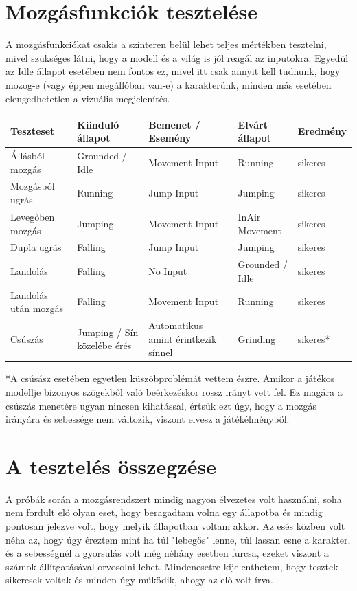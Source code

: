 \section{Mozgásfunkciók tesztelése}

A mozgásfunkciókat csakis a színteren belül lehet teljes mértékben tesztelni, mivel szükséges látni, hogy a modell és a világ is jól reagál az inputokra. Egyedül az Idle állapot esetében nem fontos ez, mivel itt csak annyit kell tudnunk, hogy mozog-e (vagy éppen megállóban van-e) a karakterünk, minden más esetében elengedhetetlen a vizuális megjelenítés.

\begin{tabularx}{\textwidth}{ 
  | >{\raggedright\arraybackslash}X 
  | >{\raggedright\arraybackslash}X 
  | >{\raggedright\arraybackslash}X 
  | >{\raggedright\arraybackslash}X
  | >{\raggedright\arraybackslash}X |}
\hline
Teszteset & Kiinduló állapot & Bemenet / Esemény & Elvárt állapot & Eredmény\\
\hline
Állásból mozgás & Grounded / Idle & Movement Input & Running & sikeres\\
Mozgásból ugrás & Running & Jump Input & Jumping & sikeres\\
Levegőben mozgás & Jumping & Movement Input & InAir Movement & sikeres\\
Dupla ugrás & Falling & Jump Input & Jumping & sikeres\\
Landolás & Falling & No Input & Grounded / Idle & sikeres\\
Landolás után mozgás & Falling & Movement Input & Running & sikeres\\
Csúszás & Jumping / Sín közelébe érés & Automatikus amint érintkezik sínnel & Grinding & sikeres*\\
\hline
\end{tabularx}

\vspace{1cm}
*A csúsász esetében egyetlen küszöbproblémát vettem észre. Amikor a játékos modellje bizonyos szögekből való beérkezéskor rossz irányt vett fel. Ez magára a csúszás menetére ugyan nincsen kihatással, értsük ezt úgy, hogy a mozgás irányára és sebessége nem változik, viszont elvesz a játékélményből.

\section[Összegzés]{A tesztelés összegzése}

A próbák során a mozgásrendszert mindig nagyon élvezetes volt használni, soha nem fordult elő olyan eset, hogy beragadtam volna egy állapotba és mindig pontosan jelezve volt, hogy melyik állapotban voltam akkor. Az esés közben volt néha az, hogy úgy éreztem mint ha túl "lebegős" lenne, túl lassan esne a karakter, és a sebességnél a gyorsulás volt még néhány esetben furcsa, ezeket viszont a számok állítgatásával orvosolni lehet. Mindenesetre kijelenthetem, hogy tesztek sikeresek voltak és minden úgy működik, ahogy az elő volt írva.
